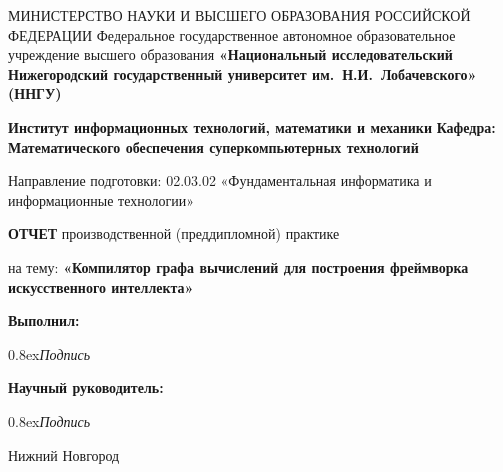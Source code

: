 {
\begin{titlepage}
  \begin{center}
    МИНИСТЕРСТВО НАУКИ И ВЫСШЕГО ОБРАЗОВАНИЯ РОССИЙСКОЙ ФЕДЕРАЦИИ\break
    Федеральное государственное автономное образовательное учреждение высшего образования\break
    \textbf{«Национальный исследовательский Нижегородский государственный университет им.~Н.И.~Лобачевского» (ННГУ)}
    \break

    \vspace*{1.25cm}

    \textbf{Институт информационных технологий, математики и механики}\break
    \textbf{Кафедра: Математического обеспечения суперкомпьютерных технологий}
    \vspace{0.5cm}

    Направление подготовки: 02.03.02 «Фундаментальная информатика и информационные технологии»\break

    \vspace{2.5cm}

    \large{\textbf{ОТЧЕТ}}\break
    производственной (преддипломной) практике\break

    \vspace{0.25cm}

    на тему:\break
    \large{\textbf{«Компилятор графа вычислений для построения фреймворка искусственного интеллекта»}}
  \end{center}

\vspace{2cm}

\hfill\textbf{Выполнил:} 

 \hfill \makebox[2cm]{\hrulefill} 

 \hfill  {\raise0.8ex\hbox{\footnotesize \textit{Подпись}}} \makebox[5.65cm]{\hfill}

 \hfill\textbf{Научный руководитель:} 

 \hfill \makebox[2cm]{\hrulefill} 

 \hfill  {\raise0.8ex\hbox{\footnotesize \textit{Подпись}}} \makebox[5.55cm]{\hfill}

\vfill
\begin{center}
  Нижний Новгород
\end{center}
\end{titlepage}
}
